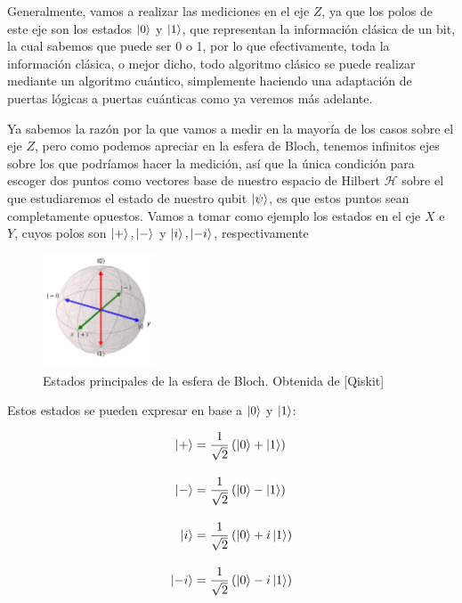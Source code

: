 \documentclass[12pt]{article}
\numberwithin{equation}{section} %
\begin{document}
    \vspace{5mm}

    Generalmente, vamos a realizar las mediciones en el eje \( Z \), ya que los polos de este eje son los estados \( \ket{0} \) y \( \ket{1} \), que representan la información clásica de un bit, la cual sabemos que puede ser 0 o 1, por lo que efectivamente, toda la información clásica, o mejor dicho, todo algoritmo clásico se puede realizar mediante un algoritmo cuántico, simplemente haciendo una adaptación de puertas lógicas a puertas cuánticas como ya veremos más adelante. 

    \vspace{5mm}

    Ya sabemos la razón por la que vamos a medir en la mayoría de los casos sobre el eje \( Z \), pero como podemos apreciar en la esfera de Bloch, tenemos infinitos ejes sobre los que podríamos hacer la medición, así que la única condición para escoger dos puntos como vectores base de nuestro espacio de Hilbert \( \mathcal{H} \) sobre el que estudiaremos el estado de nuestro qubit \( \ket{\psi} \), es que estos puntos sean completamente opuestos. Vamos a tomar como ejemplo los estados en el eje \( X \) e \( Y \), cuyos polos son \( \ket{+}, \ket{-} \) y \( \ket{i}, \ket{-i} \), respectivamente

    \begin{figure}[H]
        \centering
        \includegraphics[width=0.3\textwidth]{img/Bloch/bloch_other_bases.png}
        \caption{Estados principales de la esfera de Bloch. Obtenida de [Qiskit]}\label{fig: bloch_other_bases}
    \end{figure}

    Estos estados se pueden expresar en base a \( \ket{0} \) y \( \ket{1} \):

    \begin{align}
        \label{eq: estados_eje_x_y}
        \ket{+} &= \frac{1}{\sqrt{2}} \left( \ket{0} + \ket{1} \right) \\[10pt]
        \ket{-} &= \frac{1}{\sqrt{2}} \left( \ket{0} - \ket{1} \right) \\[10pt]
        \ket{i} &= \frac{1}{\sqrt{2}} \left( \ket{0} + i\ket{1} \right) \\[10pt]
        \ket{-i} &= \frac{1}{\sqrt{2}} \left( \ket{0} - i\ket{1} \right)
    \end{align}
\end{document}

